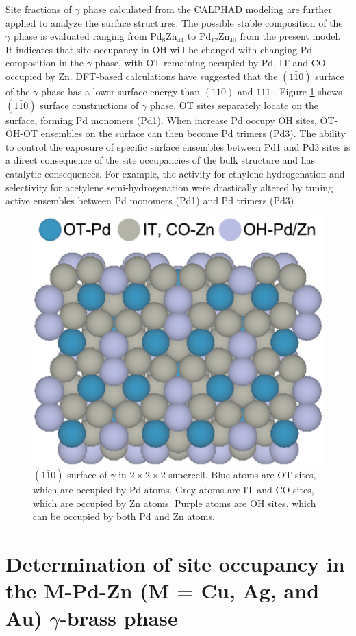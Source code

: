 Site fractions of $\gamma$ phase calculated from the CALPHAD modeling are further applied to analyze the surface structures. The possible stable composition of the $\gamma$ phase is evaluated ranging from Pd$_8$Zn$_{44}$ to Pd$_{12}$Zn$_{40}$ from the present model. It indicates that site occupancy in OH will be changed with changing Pd composition in the $\gamma$ phase, with OT remaining occupied by Pd, IT and CO occupied by Zn. DFT-based calculations have suggested that the $(1\bar{1}0)$ surface of the $\gamma$ phase has a lower surface energy than $(110)$ and ${111}$ \cite{Dasgupta2022}. Figure \ref{intermetallics:fig:PdZnSurface} shows $(1\bar{1}0)$ surface constructions of $\gamma$ phase. OT sites separately locate on the surface, forming Pd monomers (Pd1). When increase Pd occupy OH sites, OT-OH-OT ensembles on the surface can then become Pd trimers (Pd3). The ability to control the exposure of specific surface ensembles between Pd1 and Pd3 sites is a direct consequence of the site occupancies of the bulk structure and has catalytic consequences. For example, the activity for ethylene hydrogenation and selectivity for acetylene semi-hydrogenation were drastically altered by tuning active ensembles between Pd monomers (Pd1) and Pd trimers (Pd3) \cite{Dasgupta2022}. 

\begin{figure}[H]
    \centering
    \includegraphics[width=0.4\linewidth]{intermetallics/Intermetallics-PdZnSurface.jpg}
    \caption{$(1\bar{1}0)$ surface of $\gamma$ in $2\times2\times2$ supercell. Blue atoms are OT sites, which are occupied by Pd atoms. Grey atoms are IT and CO sites, which are occupied by Zn atoms. Purple atoms are OH sites, which can be occupied by both Pd and Zn atoms.}
    \label{intermetallics:fig:PdZnSurface}
\end{figure}

\section{Determination of site occupancy in the M-Pd-Zn (M = Cu, Ag, and Au) \texorpdfstring{$\gamma$}--brass phase} \label{intermetallics:sec:PdZnM}







